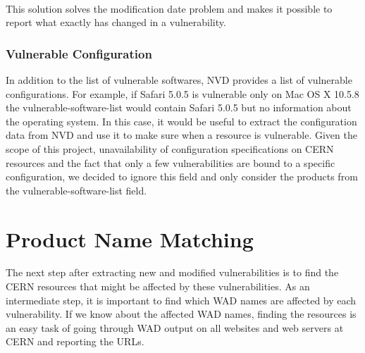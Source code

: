\paragraph{}
This solution solves the modification date problem and makes it possible to report what exactly has changed in a vulnerability. 

\subsubsection{Vulnerable Configuration}
In addition to the list of vulnerable softwares, NVD provides a list of vulnerable configurations. For example, if Safari 5.0.5 is vulnerable only on Mac OS X 10.5.8 the vulnerable-software-list would contain Safari 5.0.5 but no information about the operating system. In this case, it would be useful to extract the configuration data from NVD and use it to make sure when a resource is vulnerable. Given the scope of this project, unavailability of configuration specifications on CERN resources and the fact that only a few vulnerabilities are bound to a specific configuration, we decided to ignore this field and only consider the products from the vulnerable-software-list field. 




\section{Product Name Matching}
\label{name_matching}
The next step after extracting new and modified vulnerabilities is to find the CERN resources that might be affected by these vulnerabilities. As an intermediate step, it is important to find which WAD names are affected by each vulnerability. If we know about the affected WAD names, finding the resources is an easy task of going through WAD output on all websites and web servers at CERN and reporting the URLs. 

